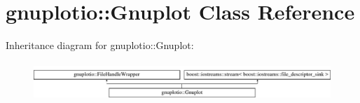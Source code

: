 \hypertarget{classgnuplotio_1_1_gnuplot}{}\section{gnuplotio\+:\+:Gnuplot Class Reference}
\label{classgnuplotio_1_1_gnuplot}
Inheritance diagram for gnuplotio\+:\+:Gnuplot\+:\begin{figure}[H]
\begin{center}
\leavevmode
\includegraphics[height=1.469816cm]{classgnuplotio_1_1_gnuplot}
\end{center}
\end{figure}
